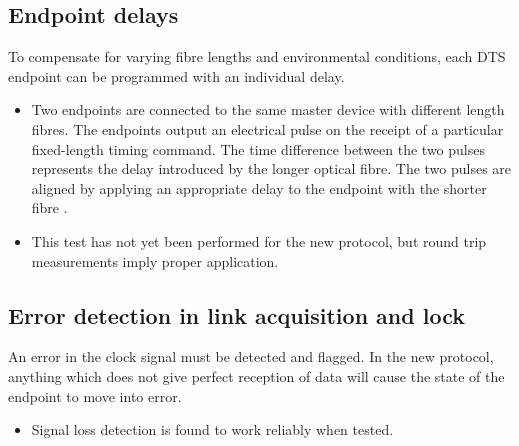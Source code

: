 \documentclass{dune}
\begin{document}
\subsection{Endpoint delays}
To compensate for varying fibre lengths and environmental conditions, each DTS endpoint can be programmed with an individual delay.
\begin{itemize}
  \item Two endpoints are connected to the same master device with different length fibres.
  The endpoints output an electrical pulse on the receipt of a particular fixed-length timing command.
  The time difference between the two pulses represents the delay introduced by the longer optical fibre.
  The two pulses are aligned by applying an appropriate delay to the endpoint with the shorter fibre \cite{delays}.
  \item This test has not yet been performed for the new protocol, but round trip measurements imply proper application.
\end{itemize}

\subsection{Error detection in link acquisition and lock}
An error in the clock signal must be detected and flagged.
In the new protocol, anything which does not give perfect reception of data will cause the state of the endpoint to move into error.
\begin{itemize}
  \item Signal loss detection is found to work reliably when tested.
\end{itemize}
\end{document}
